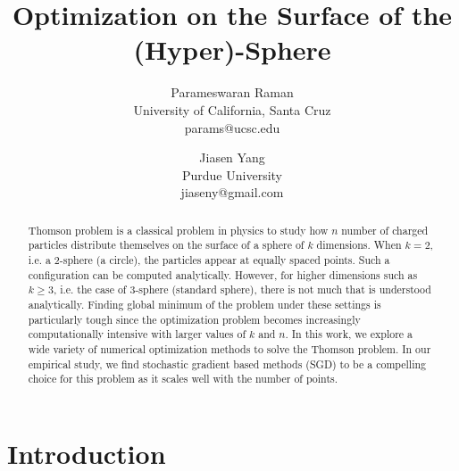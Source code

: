 \documentclass[11pt]{article}
\begin{document}


\title{Optimization on the Surface of the (Hyper)-Sphere}
\author{
Parameswaran Raman\footnotemark[1]\\
       {University of California, Santa Cruz}\\
       {params@ucsc.edu}
\and
Jiasen Yang\\
        {Purdue University}\\
        {jiaseny@gmail.com}
}

\date{} %

\maketitle

\begin{abstract}
Thomson problem is a classical problem in physics to study how $n$ number of charged particles distribute themselves on the surface of a sphere of $k$ dimensions. When $k=2$, i.e. a 2-sphere (a circle), the particles appear at equally spaced points. Such a configuration can be computed analytically. However, for higher dimensions such as $k \ge 3$, i.e. the case of 3-sphere (standard sphere), there is not much that is understood analytically. Finding global minimum of the problem under these settings is particularly tough since the optimization problem becomes increasingly computationally intensive with larger values of $k$ and $n$. In this work, we explore a wide variety of numerical optimization methods to solve the Thomson problem. In our empirical study, we find stochastic gradient based methods (SGD) to be a compelling choice for this problem as it scales well with the number of points.
\end{abstract}

\thispagestyle{empty}



\setcounter{page}{1}

\section{Introduction}
\end{document}
